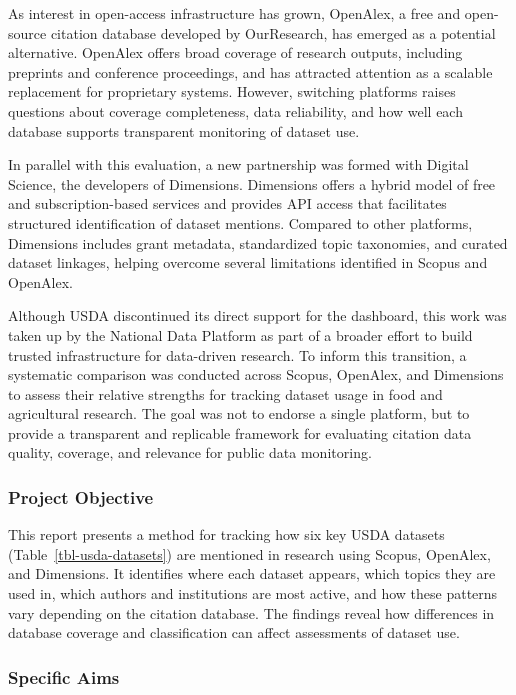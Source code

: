 \documentclass[
  letterpaper,
  DIV=11,
  numbers=noendperiod]{scrartcl}
\begin{document}
As interest in open-access infrastructure has grown, OpenAlex, a free
and open-source citation database developed by OurResearch, has emerged
as a potential alternative. OpenAlex offers broad coverage of research
outputs, including preprints and conference proceedings, and has
attracted attention as a scalable replacement for proprietary systems.
However, switching platforms raises questions about coverage
completeness, data reliability, and how well each database supports
transparent monitoring of dataset use.

In parallel with this evaluation, a new partnership was formed with
Digital Science, the developers of Dimensions. Dimensions offers a
hybrid model of free and subscription-based services and provides API
access that facilitates structured identification of dataset mentions.
Compared to other platforms, Dimensions includes grant metadata,
standardized topic taxonomies, and curated dataset linkages, helping
overcome several limitations identified in Scopus and OpenAlex.

Although USDA discontinued its direct support for the dashboard, this
work was taken up by the National Data Platform as part of a broader
effort to build trusted infrastructure for data-driven research. To
inform this transition, a systematic comparison was conducted across
Scopus, OpenAlex, and Dimensions to assess their relative strengths for
tracking dataset usage in food and agricultural research. The goal was
not to endorse a single platform, but to provide a transparent and
replicable framework for evaluating citation data quality, coverage, and
relevance for public data monitoring.

\subsubsection{Project Objective}\label{project-objective}

This report presents a method for tracking how six key USDA datasets
(Table~\ref{tbl-usda-datasets}) are mentioned in research using Scopus,
OpenAlex, and Dimensions. It identifies where each dataset appears,
which topics they are used in, which authors and institutions are most
active, and how these patterns vary depending on the citation database.
The findings reveal how differences in database coverage and
classification can affect assessments of dataset use.

\subsubsection{Specific Aims}\label{sec-aims}
\end{document}
